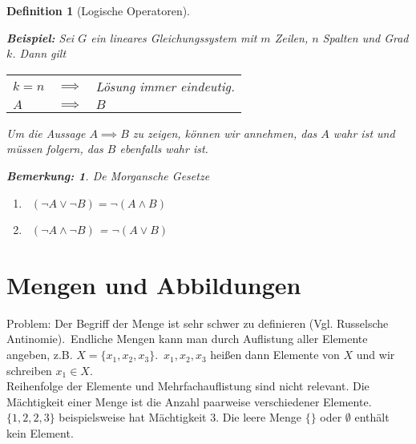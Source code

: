 \documentclass{report}
\newcommand{\IN}[1]{\index{#1|BH}}
\theoremstyle{customrem}
\newtheorem*{bemerkung}{Bemerkung\textnormal:}
\theoremstyle{customdef}
\newtheorem{definition}{Definition}[chapter]
\theoremstyle{customenv}
\begin{document}
\begin{definition}[Logische Operatoren]
\begin{enumerate}
		\end{enumerate}
		\textbf{Beispiel:} Sei \(G\) ein lineares Gleichungssystem mit \(m\) Zeilen, \(n\) Spalten und Grad \(k\). Dann gilt
		\begin{center}
			\begin{tabular}{l c l}
				\(k = n\) & \(\implies\) & Lösung immer eindeutig.\\
				\(A\) & \(\implies\) &  \(B\)\\
			\end{tabular}
		\end{center}
		Um die Aussage \(A \implies B\) zu zeigen, können wir annehmen, das \(A\) wahr ist und müssen folgern, das \(B\) ebenfalls wahr ist.\\
		\begin{bemerkung} De Morgansche Gesetze
			\begin{enumerate}
				\item\ \((\neg A \lor \neg B) = \neg (A \land B)\)
				\item\ \((\neg A \land \neg B)\) = \(\neg (A \lor B)\)
			\end{enumerate}
		\end{bemerkung}
	\end{definition}


	\section{Mengen und Abbildungen}
	\IN{Menge}
	Problem: Der Begriff der Menge ist sehr schwer zu definieren (Vgl. Russelsche Antinomie).\
	Endliche Mengen kann man durch Auflistung aller Elemente angeben, z.B. \(X = \{x_1, x_2, x_3\}\).\ \(x_1, x_2, x_3\) heißen dann Elemente von \(X\) und wir schreiben \(x_1 \in X\).\\

	Reihenfolge der Elemente und Mehrfachauflistung sind nicht relevant. Die Mächtigkeit einer Menge ist die Anzahl paarweise verschiedener Elemente. \(\{1, 2, 2, 3\}\) beispielsweise hat Mächtigkeit \(3\).
	Die leere Menge \(\{\}\) oder \(\emptyset\) enthält kein Element.
\end{document}
